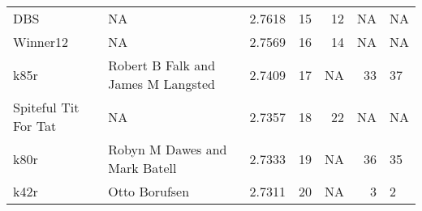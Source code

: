 \begin{tabular}{llrrrrl}
DBS                        &                                  NA &  2.7618 &    15 &            12 &             NA &              NA \\
Winner12                   &                                  NA &  2.7569 &    16 &            14 &             NA &              NA \\
k85r                       &  Robert B Falk and James M Langsted &  2.7409 &    17 &            NA &             33 &              37 \\
Spiteful Tit For Tat       &                                  NA &  2.7357 &    18 &            22 &             NA &              NA \\
k80r                       &       Robyn M Dawes and Mark Batell &  2.7333 &    19 &            NA &             36 &              35 \\
k42r                       &                       Otto Borufsen &  2.7311 &    20 &            NA &              3 &               2 \\
\bottomrule
\end{tabular}
